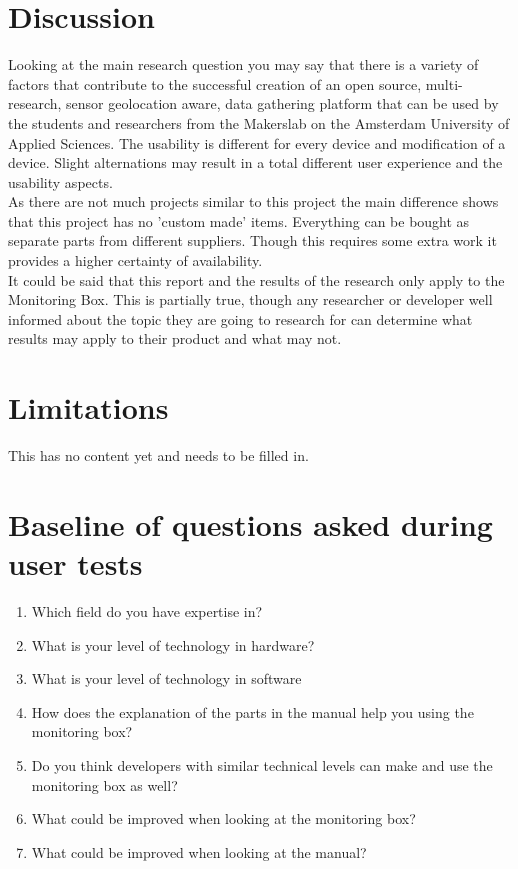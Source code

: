 \documentclass[conference]{IEEEtran}
\begin{document}
\section{Discussion}
Looking at the main research question you may say that there is a variety of factors that contribute to the successful creation of an open source, multi-research, sensor geolocation aware, data gathering platform that can be used by the students and researchers from the Makerslab on the Amsterdam University of Applied Sciences. The usability is different for every device and modification of a device. Slight alternations may result in a total different user experience and the usability aspects. \\
As there are not much projects similar to this project the main difference shows that this project has no 'custom made' items. Everything can be bought as separate parts from different suppliers. Though this requires some extra work it provides a higher certainty of availability. \\
It could be said that this report and the results of the research only apply to the Monitoring Box. This is partially true, though any researcher or developer well informed about the topic they are going to research for can determine what results may apply to their product and what may not.

\section{Limitations}
This has no content yet and needs to be filled in. 





\appendices
\section{Baseline of questions asked during user tests}
\begin{enumerate}
\item Which field do you have expertise in?
\item What is your level of technology in hardware?
\item What is your level of technology in software
\item How does the explanation of the parts in the manual help you using the monitoring box?
\item Do you think developers with similar technical levels can make and use the monitoring box as well?\item What could be improved when looking at the monitoring box?
\item What could be improved when looking at the manual?
\end{enumerate}
\end{document}
